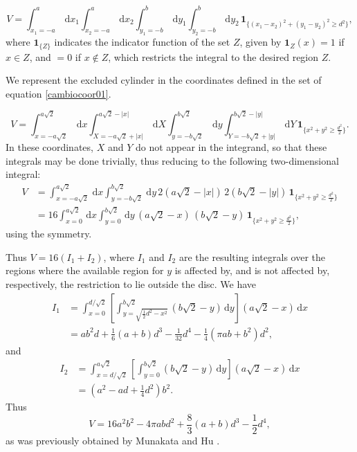 \documentclass[letterpaper,10pt]{article}
\newcommand{\rd}{\, \mathrm{d}}
\newcommand{\indicator}[1]{\mathbf{1}_{ \{   #1 \} } }
\begin{document}
\begin{equation}
 V = \int_{x_1 = -a}^a \rd x_1 \int_{x_2 = -a}^a \rd x_2 
\int_{y_1 = -b}^b \rd y_1 \int_{y_2 = -b}^b \rd y_2 \, \indicator{ (x_1-x_2)^2 + (y_1-y_2)^2 \ge d^2 },
\end{equation}
where $\indicator{Z}$ indicates the indicator function of the set $Z$, given by $\mathbf{1}_Z (x) = 1$ if $x \in Z$, and $=0$ if $x \notin Z$, which restricts the integral to the desired region $Z$.

We represent the excluded cylinder in the coordinates defined in 
the set of equation \ref{cambiocoor01}. 

\begin{equation}
 V = \int_{x=-a \sqrt{2}}^{a \sqrt{2}} \rd x 
\int_{X=-a \sqrt{2} + |x| }^{a \sqrt{2} - |x|}  \rd X
 \int_{y=-b \sqrt{2}}^{b \sqrt{2}} \rd y
\int_{Y=-b \sqrt{2} + |y| }^{b \sqrt{2}-|y|}  \rd Y
\, \indicator{ x^2 + y^2 \ge \frac{d^2}{2}  }.
\end{equation}
In these coordinates, $X$ and $Y$ do not appear in the integrand, so that these integrals may be done trivially, thus reducing to the following two-dimensional integral:
\begin{align}
 V &= \int_{x=-a \sqrt{2}}^{a \sqrt{2}} \rd x  \int_{y=-b \sqrt{2}}^{b \sqrt{2}} \rd y
\, 2 \left( a \sqrt{2} - |x| \right) \, 2 \left( b \sqrt{2} - |y| \right) \,  \indicator{ x^2 + y^2 \ge \frac{d^2}{2} } \\
&= 16 \int_{x=0}^{a \sqrt{2}} \rd x  \int_{y=0}^{b \sqrt{2}} \rd y
\, \left( a \sqrt{2} - x \right) \, \left( b \sqrt{2} - y \right) \,  \indicator{ x^2 + y^2 \ge \frac{d^2}{2} },
\end{align}
using the symmetry.

Thus $V = 16(I_1 + I_2)$, where $I_1$ and $I_2$ are the resulting integrals over the regions where the available region for $y$ is affected by, and is not affected by, respectively, the restriction to lie outside the disc.
We have
\begin{align}
 I_1 &= \int_{x=0}^{d / \sqrt{2}} \left[ \int_{y = \sqrt{\frac{1}{2} {d^2} - x^2}}^{b \sqrt{2}} \left( b \sqrt{2} - y \right) \rd y \right]  \left( a \sqrt{2} - x \right) \rd x \\
&= 	
a b^{2} d + \textstyle \frac{1}{6} (a+b) d^{3} - \frac{1}{32}  d^{4} - \frac{1}{4} {\left(\pi a b + b^{2}\right)} d^{2},
\end{align}
and
\begin{align}
 I_2 &= \int_{x=d / \sqrt{2}}^{a \sqrt{2}} \left[ \int_{y = 0}^{b \sqrt{2}} \left( b \sqrt{2} - y \right) \rd y \right]  \left( a \sqrt{2} - x \right) \rd x \\
&=	
{\left( a^{2} - a d + \textstyle \frac{1}{4}  d^{2}\right)} b^{2}.
\end{align}
Thus 
\begin{equation}\label{volumeabd}
 V %
= 16 a^{2} b^{2}  - 4 \pi a b d^{2} + \textstyle \frac{8}{3} (a+b) d^{3}  - \frac{1}{2} d^{4},
\end{equation}
as was previously obtained by Munakata and Hu \cite{Munakata02}.
\end{document}
